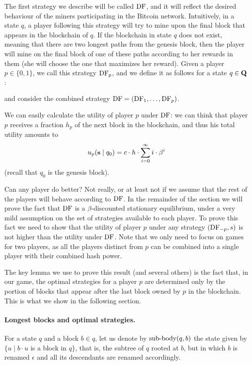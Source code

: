   The first strategy we describe will be called $\text{\rm DF}$, and it will reflect the desired behaviour of the miners participating in the Bitcoin network. Intuitively, in a state $q$, a player following this strategy will try to mine upon the final block that appears in the blockchain of $q$. If the blockchain in state $q$ does not exist, meaning that there are two longest paths from the genesis block, then the player will mine on the final block of one of these paths according to her rewards in them (she will choose the one that maximizes her reward). Given a player $p \in \{0,1\}$, we call this strategy $\text{\rm DF}_p$, and we define it as follows for a state $q \in \mathbf{Q}$:

and consider the combined strategy $\text{\rm DF} = (\text{\rm DF}_1,\dots,\text{\rm DF}_p)$. 

We can easily calculate the utility of player $p$ under $\text{\rm DF}$: we can think that player $p$ receives a fraction $h_p$ of the next block in the blockchain, and thus his 
total utility amounts to $$u_p(\mathbf{s} \mid q_0) = c\cdot h \cdot \sum_{i=0}^{\infty}i \cdot \beta^{i}$$ (recall that $q_0$ is the genesis block). 

Can any player do better? Not really, or at least not if we assume that the rest of the players will behave according to $\text{\rm DF}$. In the remainder of the section we 
will prove the fact that $\text{\rm DF}$ is a $\beta$-discounted stationary equilibrium, under a very mild assumption on the set of strategies available to each player. 
To prove this fact we need to show that the utility of player $p$ under any strategy $(\text{\rm DF}_{-p},s)$ is not higher than the utility under $\text{\rm DF}$. Note that we only need to focus on 
games for two players, as all the players distinct from $p$ can be combined into a single player with their combined hash power. 

The key lemma we use to prove this result (and several others) is the fact that, in our game, the optimal strategies for a player $p$ are determined only by the portion 
of blocks that appear after the last block owned by $p$ in the blockchain. This is what we show in the following section. 


\paragraph{Longest blocks and optimal strategies.}
For a state $q$ and a block $b \in q$, let us denote by ${\text{\rm sub-body}}(q,b)$ the state
given by $\{u \mid b\cdot u$ is a block in $q\}$, that is, the subtree of $q$ rooted at $b$, but in which $b$ is renamed 
$\epsilon$ and all its descendants are renamed accordingly. 

